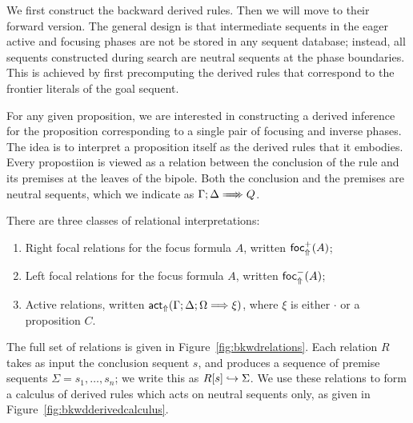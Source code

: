 We first construct the backward derived rules. Then we will move to their
forward version. The general design is that intermediate sequents in the eager
active and focusing phases are not be stored in any sequent database; instead,
all sequents constructed during search are neutral sequents at the phase
boundaries. This is achieved by first precomputing the derived rules that
correspond to the frontier literals of the goal sequent.

For any given proposition, we are interested in constructing a derived inference
for the proposition corresponding to a single pair of focusing and inverse
phases. The idea is to interpret a proposition itself as the derived rules that
it embodies. Every propostiion is viewed as a relation between the conclusion of
the rule and its premises at the leaves of the bipole. Both the conclusion and
the premises are neutral sequents, which we indicate as
$\bneuseq{\Gamma}{\Delta}{Q}$.

There are three classes of relational interpretations:

\begin{enumerate}
\item Right focal relations for the focus formula $A$, written $\textsf{foc}^+_{\Uparrow}(A)$;
\item Left focal relations for the focus formula $A$, written $\textsf{foc}^-_{\Uparrow}(A)$;
\item Active relations, written
  $\textsf{act}_{\Uparrow}(\Gamma; \Delta; \Omega \Longrightarrow \xi)$, where $\xi$ is either
  $\cdot$ or a proposition $C$.
\end{enumerate}

The full set of relations is given in Figure~\ref{fig:bkwdrelations}. Each
relation $R$ takes as input the conclusion sequent $s$, and produces a sequence
of premise sequents $\Sigma = s_1, \dots, s_n$; we write this as
$R [s] \hookrightarrow \Sigma$. We use these relations to form a calculus of derived
rules which acts on neutral sequents only, as given in
Figure~\ref{fig:bkwdderivedcalculus}.

